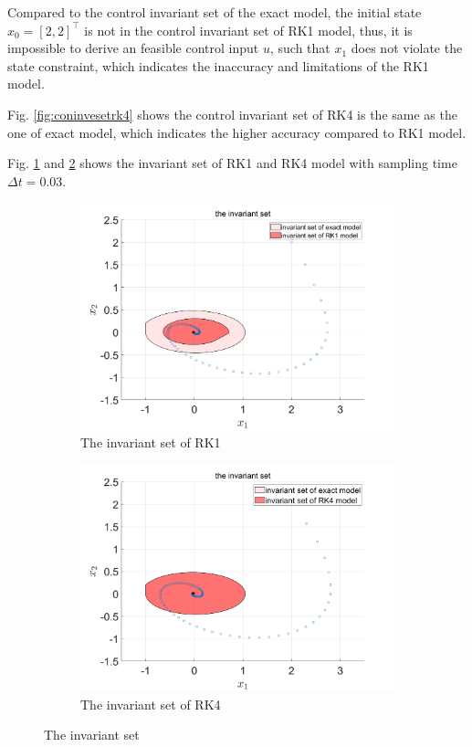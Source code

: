 Compared to the control invariant set of the exact model, the initial state $x_0 = [2,2]^{\top}$ is not in the control invariant set of RK1 model, thus, it is impossible to derive an feasible control input $u$, such that $x_1$ does not violate the state constraint, which indicates the inaccuracy and limitations of the RK1 model.

Fig. \ref{fig:coninvesetrk4} shows the control invariant set of RK4 is the same as the one of exact model, which indicates the higher accuracy compared to RK1 model.

Fig. \ref{fig:invesetrk1} and \ref{fig:invesetrk4} shows the invariant set of RK1 and RK4 model with sampling time $\Delta t = 0.03$.
\begin{figure}[H]
	\centering
	\begin{subfigure}[b]{0.37\textwidth}
		\centering
		\includegraphics[width=\linewidth]{pics/invsetrk1.png}
		\caption{The invariant set of RK1}
		\label{fig:invesetrk1}
	\end{subfigure}
	\hfill
	\begin{subfigure}[b]{0.37\textwidth}
		\includegraphics[width=\linewidth]{pics/invsetrk4.png}
		\caption{The invariant set of RK4}
		\label{fig:invesetrk4}
	\end{subfigure}
    \caption{The invariant set}
	\label{fig:The invariant set}
\end{figure}

